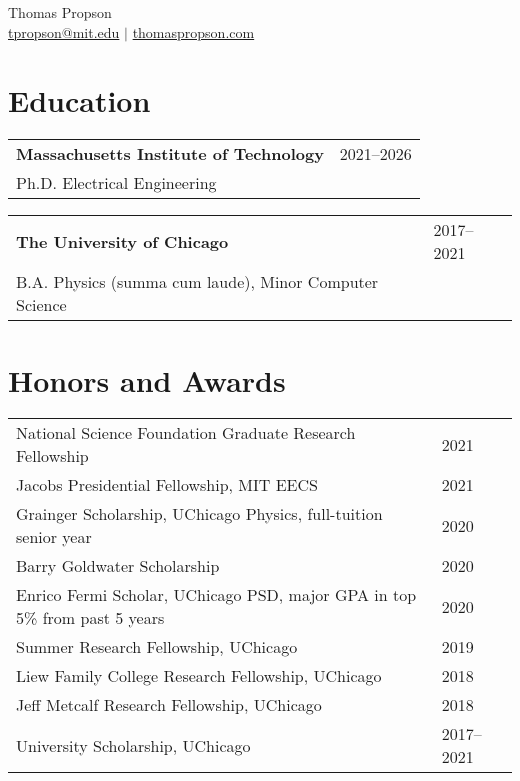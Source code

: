 \documentclass[letterpaper, 11pt]{article}
\begin{document}
\begin{center}
{\large Thomas Propson} \\[5pt]
\href{mailto:tpropson@mit.edu}{tpropson@mit.edu} $\vert$
\href{https://thomaspropson.com}{thomaspropson.com}
\end{center}


\flushleft

\section{Education}
\begin{tabular}{@{} L{12cm} @{} R{4.51cm} @{}}
  \textbf{Massachusetts Institute of Technology} & 2021--2026\\
  Ph.D. Electrical Engineering\\
\end{tabular}
\begin{tabular}{@{} L{12cm} @{} R{4.51cm} @{}}
  \textbf{The University of Chicago} & 2017--2021\\
  B.A. Physics (summa cum laude), Minor Computer Science\\
\end{tabular}

\section{Honors and Awards}
\begin{tabular}{@{} L{14.5cm} @{} R{2.01cm} @{}}
  National Science Foundation Graduate Research Fellowship & 2021\\
  Jacobs Presidential Fellowship, MIT EECS & 2021\\
  Grainger Scholarship, UChicago Physics, full-tuition senior year & 2020\\
  Barry Goldwater Scholarship & 2020\\
  Enrico Fermi Scholar, UChicago PSD, major GPA in top 5\% from past 5 years & 2020\\
  Summer Research Fellowship, UChicago & 2019\\
  Liew Family College Research Fellowship, UChicago & 2018\\
  Jeff Metcalf Research Fellowship, UChicago & 2018 \\
  University Scholarship, UChicago & 2017--2021\\
\end{tabular}

\end{document}
